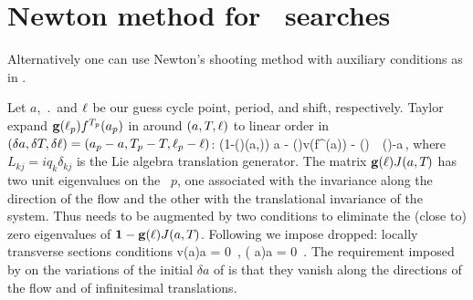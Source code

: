 

\section{Newton method  for \rpo\ searches}
\label{sec:NewtRPOs}

Alternatively one can use Newton's shooting method with auxiliary conditions 
as in .

Let $a$, $\period{}$ and $\ell$
be our guess cycle point, period, and shift, respectively.
Taylor expand $\mathbf{g}(\ell_p) {f^{{T_{p}}}(a_p)}$ in 
around $(a, {T_{}}, \ell)$ to linear order in
$(\delta a,\delta {T_{}},\delta \ell)
   =(a_p-a,{T_{p}} - {T_{}},\ell_p-\ell)$:
\beq
    \left({1}-(\shift)\jMps(a,\period{})\right) \delta a
   - (\shift)v(f^{\period{}}(a)) \delta \period{}
                            - (\shift) \delta \shift
                    \,\simeq\, (\shift)-a\,,
    \label{eq:NewtonBasicCond}
\eeq
where $L_{kj}=i q_k \delta_{kj}$ is the Lie algebra translation
generator. The matrix $\mathbf{g}(\ell){J}(a,{T_{}})$
has two unit eigenvalues on the \rpo\ $p$,
one associated with the invariance along
the direction of the flow and the other with the
translational invariance of the system. Thus 
needs to be augmented by two conditions to
eliminate the (close to) zero eigenvalues of
$\mathbf{1}-\mathbf{g}(\ell){J}(a,{T_{}})$. Following
 we impose dropped: locally transverse sections
conditions
\beq
    v(a)\cdot\delta a  =  0
    \,,\qquad
    \left( a\right)\cdot \delta a  =  0
\,.
\label{eq:NewtonAux}
\eeq
The requirement imposed by 
on the variations of the initial $\delta a$ of 
is that they   vanish along the directions of the flow
and of infinitesimal translations.

